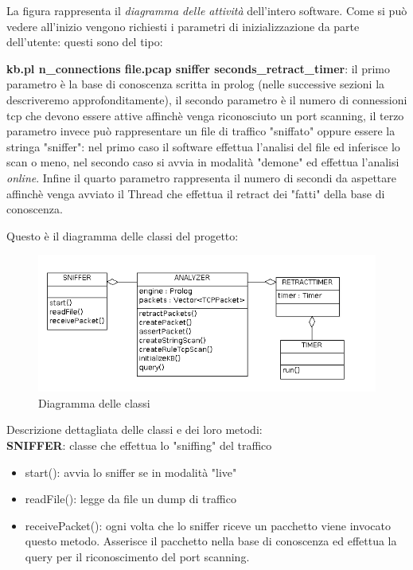 \documentclass[a4paper,12pt]{article} %
\begin{document}
La figura rappresenta il \emph{diagramma delle attività} dell'intero software. Come si può vedere
all'inizio vengono richiesti i parametri di inizializzazione da parte dell'utente: questi sono del tipo: 



\textbf{kb.pl n\_connections file.pcap sniffer seconds\_retract\_timer}: il primo parametro è la base di conoscenza
scritta in prolog (nelle successive sezioni la descriveremo approfonditamente), il secondo parametro è il numero di connessioni
tcp che devono essere attive affinch\`e venga riconosciuto un port scanning, il terzo parametro invece può rappresentare un 
file di traffico "sniffato" oppure essere la stringa "sniffer": nel primo caso il software effettua l'analisi del file ed inferisce
lo scan o meno, nel secondo caso si avvia in modalità "demone" ed effettua l'analisi \emph{online}. Infine il quarto parametro
rappresenta il numero di secondi da aspettare affinch\`e venga avviato il Thread che effettua il retract dei "fatti" della base di 
conoscenza.





Questo è il diagramma delle classi del progetto:



\begin{figure}[htbp]
\centering
\includegraphics[width=15cm]{classi.png}
\caption{\label{Diagramma delle classi} Diagramma delle classi}
\end{figure}


Descrizione dettagliata delle classi e dei loro metodi:\\


\textbf{SNIFFER}: classe che effettua lo "sniffing" del traffico

\begin{itemize}

\item start(): avvia lo sniffer se in modalità "live"
\item readFile(): legge da file un dump di traffico
\item receivePacket(): ogni volta che lo sniffer riceve un pacchetto viene invocato questo metodo.
Asserisce il pacchetto nella base di conoscenza ed effettua la query per il riconoscimento del port scanning.

\end{itemize}
\end{document}
